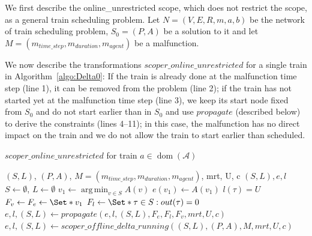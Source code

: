 \documentclass{article}
\DeclareMathOperator{\dom}{dom}
\DeclareMathOperator*{\argmin}{arg\,min}
\begin{document}
We first describe the online\_unrestricted scope, which does not restrict the scope, as a general train scheduling problem. Let $N=(V,E,R,m,a,b)$ be the network of train scheduling problem, $S_0=(P,A)$ be a solution to it and let $M=(m_{time\_step},m_{duration},m_{agent})$ be a malfunction.

We now describe the transformations $scoper\_online\_unrestricted$ for a single train in Algorithm~\ref{algo:Delta0}:
If the train is already done at the malfunction time step (line 1), it can be removed from the problem (line 2);
if the train has not started yet at the malfunction time step (line 3), we keep its start node fixed from $S_0$ and do not start earlier than in $S_0$ and use $propagate$ (described below) to derive the constraints (lines 4--11); in this case, the malfunction has no direct impact on the train and we do not allow the train to start earlier than scheduled.






\begin{algorithm}
	\caption{$scoper\_online\_unrestricted$ for train $a \in \dom(\mathcal{A})$} \label{algo:Delta0}
	\begin{algorithmic}[1]
		\Require $(S,L)$, $(P,A)$, $M=(m_{time\_step},m_{duration},m_{agent})$, mrt, U, c
	    \Ensure $(S,L),e,l$
            \State $S\leftarrow \emptyset$, $L \leftarrow \emptyset$
            \State $v_1 \leftarrow \argmin_{v\in S} A(v)$
            \State $e(v_1) \leftarrow A(v_1)$
                \State $l(\tau)=U$
            \EndFor
            \State $F_v \leftarrow F_e \leftarrow \Set*{v_1}$
            \State $F_l \leftarrow \Set*{\tau \in S: out(\tau)=0}$
            \State $e,l,(S,L) \leftarrow propagate(e,l,(S,L),F_e,F_l,F_v, mrt, U, c)$
        \Else
            \State $e,l,(S,L) \leftarrow scoper\_offline\_delta\_running((S,L), (P,A), M, mrt, U, c)$
        \EndIf
\end{algorithmic}
\end{algorithm}
\end{document}
